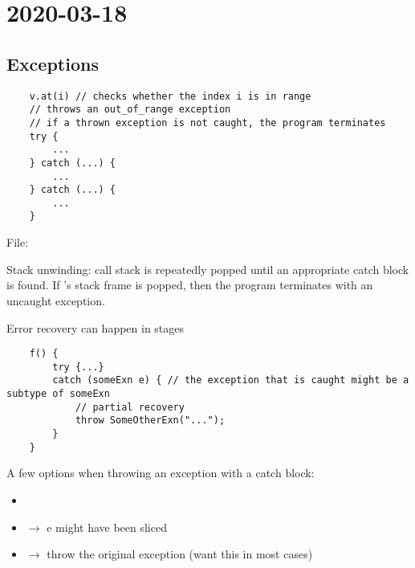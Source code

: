 \section{2020-03-18}
\subsection{Exceptions}
\begin{lstlisting}
    v.at(i) // checks whether the index i is in range
    // throws an out_of_range exception
    // if a thrown exception is not caught, the program terminates
    try {
        ...
    } catch (...) {
        ...
    } catch (...) {
        ...
    }
\end{lstlisting}
File: 

Stack unwinding: call stack is repeatedly popped until an appropriate
catch block is found. If 's stack frame is popped, then
the program terminates with an uncaught exception.

Error recovery can happen in stages
\begin{lstlisting}
    f() {
        try {...}
        catch (someExn e) { // the exception that is caught might be a subtype of someExn
            // partial recovery
            throw SomeOtherExn("...");
        }
    }
\end{lstlisting}
A few options when throwing an exception with a catch block:
\begin{itemize}
    \item {}
    \item {} $ \rightarrow $ e might have been sliced
    \item {} $ \rightarrow $ throw the original exception (want this in most cases)
\end{itemize}

